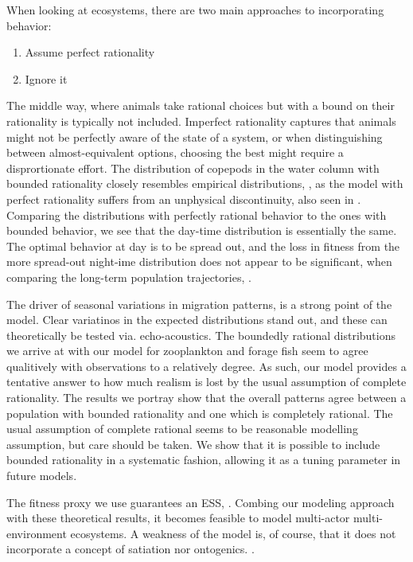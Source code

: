 When looking at ecosystems, there are two main approaches to incorporating behavior:
  \begin{enumerate}
    \item Assume perfect rationality
    \item Ignore it
  \end{enumerate}
  The middle way, where animals take rational choices but with a bound on their rationality is typically not included. Imperfect rationality captures that animals might not be perfectly aware of the state of a system, or when distinguishing between almost-equivalent options, choosing the best might require a disprortionate effort. The distribution of copepods in the water column with bounded rationality closely resembles empirical distributions, \citep{thomasetal}, as the model with perfect rationality suffers from an unphysical discontinuity, also seen in \citep{uhth}. Comparing the distributions with perfectly rational behavior to the ones with bounded behavior, we see that the day-time distribution is essentially the same. The optimal behavior at day is to be spread out, and the loss in fitness from the more spread-out night-ime distribution does not appear to be significant, when comparing the long-term population trajectories, .


The driver of seasonal variations in migration patterns, is a strong point of the model. Clear variatinos in the expected distributions stand out, and these can theoretically be tested via. echo-acoustics.
The boundedly rational distributions we arrive at with our model for zooplankton and forage fish seem to agree qualitively with observations to a relatively degree. As such, our model provides a tentative answer to how much realism is lost by the usual assumption of complete rationality. The results we portray show that the overall patterns agree between a population with bounded rationality and one which is completely rational. The usual assumption of complete rational seems to be reasonable modelling assumption, but care should be taken. We show that it is possible to include bounded rationality in a systematic fashion, allowing it as a tuning parameter in future models.






The fitness proxy we use guarantees an ESS, \citep{krivan}. Combing our modeling approach with these theoretical results, it becomes feasible to model multi-actor multi-environment ecosystems. A weakness of the model is, of course, that it does not incorporate a concept of satiation nor ontogenics. .

